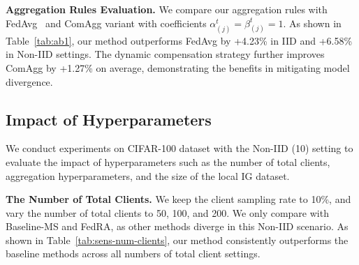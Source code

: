 \documentclass[sigconf]{acmart}
\begin{document}
\textbf{Aggregation Rules Evaluation.} 
We compare our aggregation rules with FedAvg~\cite{mcmahan2017communication} and ComAgg variant with coefficients $\alpha_{(j)}^t=\beta_{(j)}^t=1$. As shown in Table~\ref{tab:ab1}, our method outperforms FedAvg by +4.23\% in IID and +6.58\% in Non-IID settings. The dynamic compensation strategy further improves ComAgg by +1.27\% on average, demonstrating the benefits in mitigating model divergence.

\begin{table}[t]
\centering
\caption{The impacts of $T_{\text{IG}}$ and $T_{\text{Agg}}$. Experiments were conducted on CIFAR-100 under the Non-IID (10) setting. Each row varies one hyperparameter while fixing the other.}
\label{tab:sens_tig_tagg}
\end{table}

\subsection{Impact of Hyperparameters}

We conduct experiments on CIFAR-100 dataset with the Non-IID (10) setting to evaluate the impact of hyperparameters such as the number of total clients, aggregation hyperparameters, and the size of the local IG dataset.

\textbf{The Number of Total Clients.} We keep the client sampling rate to 10\%, and vary the number of total clients to 50, 100, and 200. We only compare with Baseline-MS and FedRA, as other methods diverge in this Non-IID scenario. As shown in Table~\ref{tab:sens-num-clients}, our method consistently outperforms the baseline methods across all numbers of total client settings. 
\end{document}
